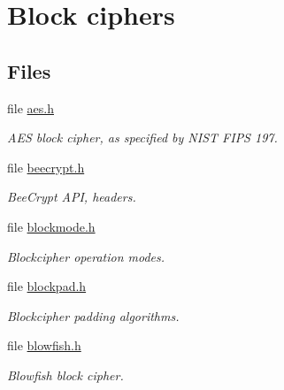 \hypertarget{group__BC__m}{
\section{Block ciphers}
\label{group__BC__m}
}
\subsection*{Files}
\begin{CompactItemize}
\item 
file \hyperlink{aes_8h}{aes.h}
\begin{CompactList}\small\item\em AES block cipher, as specified by NIST FIPS 197. \item\end{CompactList}

\item 
file \hyperlink{beecrypt_8h}{beecrypt.h}
\begin{CompactList}\small\item\em Bee\-Crypt API, headers. \item\end{CompactList}

\item 
file \hyperlink{blockmode_8h}{blockmode.h}
\begin{CompactList}\small\item\em Blockcipher operation modes. \item\end{CompactList}

\item 
file \hyperlink{blockpad_8h}{blockpad.h}
\begin{CompactList}\small\item\em Blockcipher padding algorithms. \item\end{CompactList}

\item 
file \hyperlink{blowfish_8h}{blowfish.h}
\begin{CompactList}\small\item\em Blowfish block cipher. \item\end{CompactList}

\end{CompactItemize}

